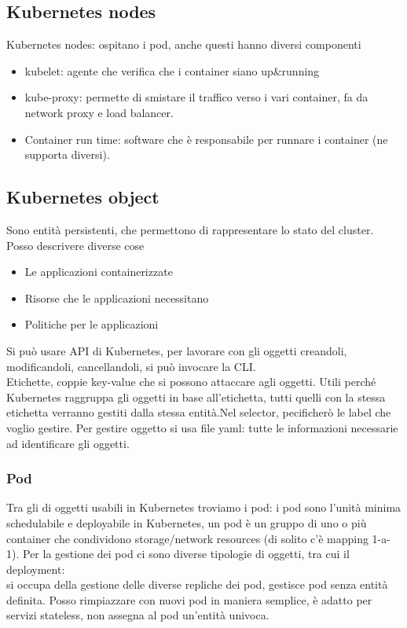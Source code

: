 \documentclass[16px]{article}
\begin{document}
\subsection{Kubernetes nodes}
Kubernetes nodes: ospitano i pod, anche questi hanno diversi componenti
\begin{itemize}
\item kubelet: agente che verifica che i container siano up\&running
\item kube-proxy: permette di smistare il traffico verso i vari container, fa da network proxy e load balancer.
\item Container run time: software che è responsabile per runnare i container (ne supporta diversi).
\end{itemize}
\subsection{Kubernetes object}
Sono entità persistenti, che permettono di rappresentare lo stato del cluster. Posso descrivere diverse cose
\begin{itemize}
\item Le applicazioni containerizzate
\item Risorse che le applicazioni necessitano
\item Politiche per le applicazioni
\end{itemize}
Si può usare API di Kubernetes, per lavorare con gli oggetti creandoli, modificandoli, cancellandoli, si può invocare la CLI.\\
Etichette, coppie key-value che si possono attaccare agli oggetti. Utili perché Kubernetes raggruppa gli oggetti in base all'etichetta, tutti quelli con la stessa etichetta verranno gestiti dalla stessa entità.Nel selector, pecificherò le label che voglio gestire. Per gestire oggetto si usa file yaml: tutte le informazioni necessarie ad identificare gli oggetti.
\subsubsection{Pod} 
Tra gli di oggetti usabili in Kubernetes troviamo i pod: i pod sono l'unità minima schedulabile e deployabile in Kubernetes, un pod è un gruppo di uno o più container che condividono storage/network resources (di solito c'è mapping 1-a-1). Per la gestione dei pod ci sono diverse tipologie di oggetti, tra cui il deployment:\\
si occupa della gestione delle diverse repliche dei pod, gestisce pod senza entità definita. Posso rimpiazzare con nuovi pod in maniera semplice, è adatto per servizi stateless, non assegna al pod un'entità univoca.
\end{document}
